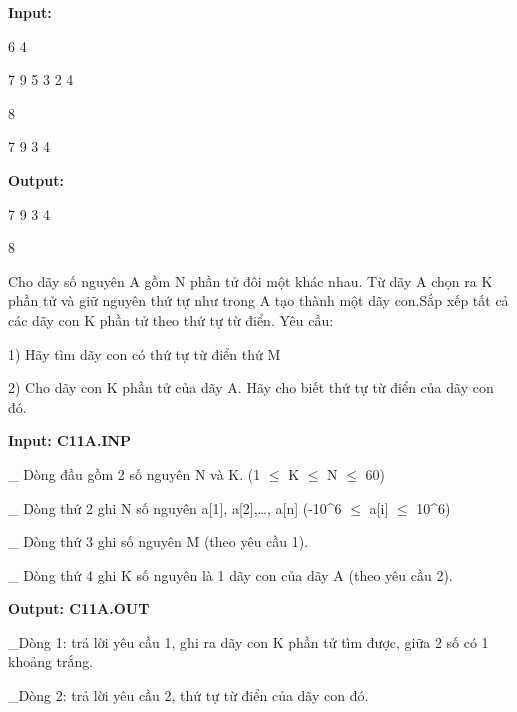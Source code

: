 \textbf{    Input:   }

   6 4  

   7 9 5 3 2 4  

   8  

   7 9 3 4  



\textbf{    Output:   }



   7 9 3 4  

   8  



    Cho dãy số nguyên A gồm N phần tử đôi một khác nhau. Từ dãy A chọn ra K phần tử và giữ nguyên thứ tự như trong A tạo thành một dãy con.Sắp xếp tất cả các dãy con K phần tử theo thứ tự từ điển. Yêu cầu:   

    1) Hãy tìm dãy con có thứ tự từ điển thứ M   

    2) Cho dãy con K phần tử của dãy A. Hãy cho biết thứ tự từ điển của dãy con đó.   

\textbf{Input: C11A.INP}

    \_ Dòng đầu gồm 2 số nguyên N và K. (1  $\le$  K  $\le$  N  $\le$  60)   

    \_ Dòng thứ 2 ghi N số nguyên a[1], a[2],…, a[n] (-10^6  $\le$  a[i]  $\le$  10^6)   

    \_ Dòng thứ 3 ghi số nguyên M (theo yêu cầu 1).   

    \_ Dòng thứ 4 ghi K số nguyên là 1 dãy con của dãy A (theo yêu cầu 2).   

\textbf{Output: C11A.OUT}

    \_Dòng 1: trả lời yêu cầu 1, ghi ra dãy con K phần tử tìm được, giữa 2 số có 1 khoảng trắng.   

    \_Dòng 2: trả lời yêu cầu 2, thứ tự từ điển của dãy con đó.   
